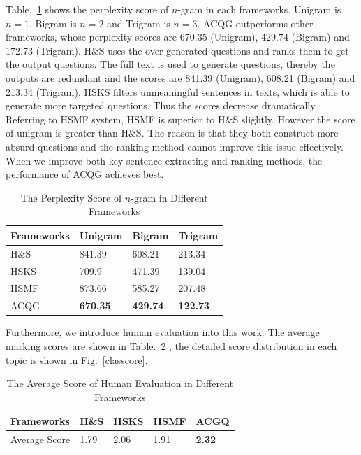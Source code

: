 \documentclass[runningheads,UTF8,article]{comsis2}
\begin{document}
	
	Table.~\ref{perplexity} shows the perplexity score of $ n $-gram in each frameworks. Unigram is $n=1$, Bigram is $ n=2$ and Trigram is $n=3$. ACQG outperforms other frameworks, whose perplexity scores are 670.35 (Unigram), 429.74 (Bigram) and 172.73 (Trigram). H\&S uses the over-generated questions and ranks them to get the output questions. The full text is used to generate questions, thereby the outputs are redundant and the scores are 841.39 (Unigram), 608.21 (Bigram) and 213.34 (Trigram). HSKS filters unmeaningful sentences in texts, which is able to generate more targeted questions. Thus the scores decrease dramatically. Referring to HSMF system, HSMF is superior to H\&S slightly. However the score of unigram is greater than H\&S. The reason is that they both construct more absurd questions and the ranking method cannot improve this issue effectively. When we improve both key sentence extracting and ranking methods, the performance of ACQG achieves best.
	\begin{table}[!ht]
		\centering
		\caption{The Perplexity Score of $n$-gram in Different Frameworks}
		\label{perplexity}
		\setlength\tabcolsep{0.5em}
		\begin{tabular}{|p{50pt}|p{50pt}p{50pt}p{50pt}|}
			\hline
			Frameworks& Unigram & Bigram & Trigram \\
			\hline
			H\&S & 841.39 & 608.21 & 213.34\\
			HSKS& 709.9 & 471.39 & 139.04 \\
			HSMF & 873.66 & 585.27 & 207.48 \\
			ACQG & \textbf{670.35} & \textbf{429.74} & \textbf{122.73} \\
			\hline
		\end{tabular}
	\end{table}
	
	
	Furthermore, we introduce human evaluation into this work. The average marking scores are shown in Table.~\ref{averagescre} , the detailed score distribution in each topic is shown in Fig.~\ref{classcore}. 
	
	
	\begin{table}[!ht]
		\centering
		\caption{The Average Score of Human Evaluation in Different Frameworks}
		\label{averagescre}
		\setlength\tabcolsep{0.5em}
		\begin{tabular}{|p{80pt}|p{40pt}p{40pt}p{40pt}p{40pt}|}
			\hline
			Frameworks  & H\&S & HSKS & HSMF & ACGQ \\
			\hline
			Average Score & 1.79& 2.06 & 1.91 &\textbf{2.32}\\
			\hline
		\end{tabular}
	\end{table}
	
\end{document}
